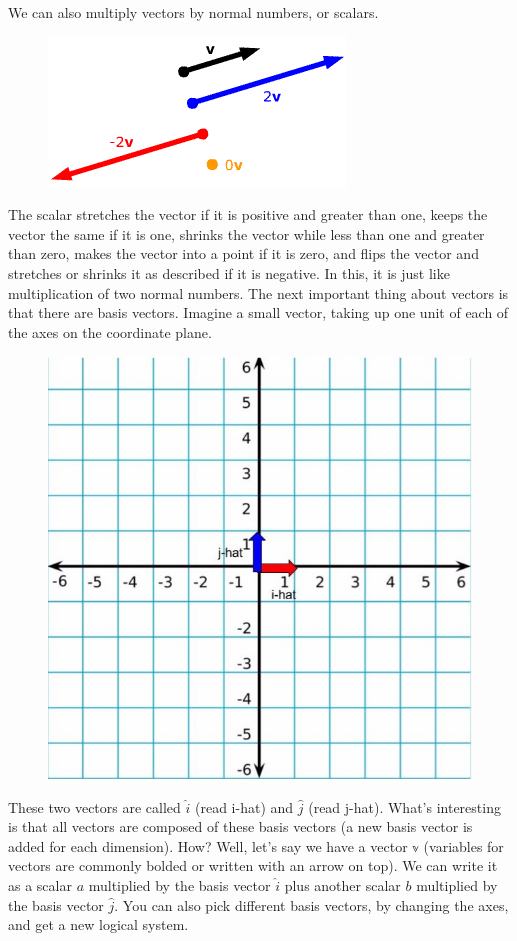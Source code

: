 We can also multiply vectors by normal numbers, or scalars. 
\begin{figure}[H]
\includegraphics{mult2.gif}
\end{figure}
The scalar stretches the vector if it is positive and greater than one, keeps the vector the same if it is one, shrinks the vector while less than one and greater than zero, makes the vector into a point if it is zero, and flips the vector and stretches or shrinks it as described if it is negative.
In this, it is just like multiplication of two normal numbers. The next important thing about vectors is that there are basis vectors. Imagine a small vector, taking up one unit of each of the axes on the coordinate plane. 
\begin{figure}[H]
\includegraphics{basis.jpg}
\end{figure}
These two vectors are called $\hat{i}$ (read i-hat) and $\hat{j}$ (read j-hat). What's interesting is that all vectors are composed of these basis vectors (a new basis vector is added for each dimension). How? Well, let's say we have a vector $\mathbb{v}$ (variables for vectors are commonly bolded or written with an arrow on top). We can write it as a scalar $a$ multiplied by the basis vector $\hat{i}$ plus another scalar $b$ multiplied by the basis vector $\hat{j}$. You can also pick different basis vectors, by changing the axes, and get a new logical system.

